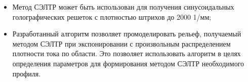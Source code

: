 \begin{itemize}
	\item Метод СЭЛТР может быть использован для получения синусоидальных голографических решеток с плотностью штрихов до 2000 1/мм;
	\item Разработанный алгоритм позволяет промоделировать рельеф, получаемый методом СЭЛТР при экспонировании с произвольным распределением плотности тока по области. Это позволяет использовать алгоритм в целях определения параметров для формирования методом СЭЛТР необходимого профиля.
\end{itemize}
